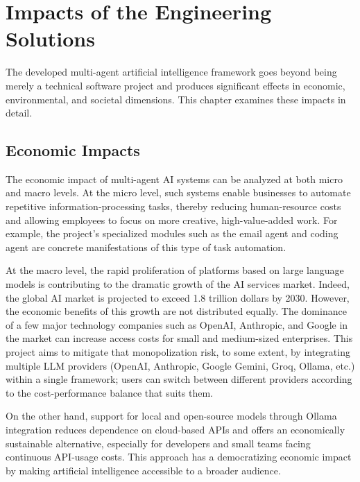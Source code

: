 \documentclass[11pt,a4paper]{report}
\begin{document}
\chapter{Impacts of the Engineering Solutions}

The developed multi-agent artificial intelligence framework goes beyond being
merely a technical software project and produces significant effects in
economic, environmental, and societal dimensions. This chapter examines these
impacts in detail.

\section{Economic Impacts}

The economic impact of multi-agent AI systems can be analyzed at both micro
and macro levels. At the micro level, such systems enable businesses to
automate repetitive information-processing tasks, thereby reducing
human-resource costs and allowing employees to focus on more creative,
high-value-added work. For example, the project's specialized modules such as
the email agent and coding agent are concrete manifestations of this type of
task automation.

At the macro level, the rapid proliferation of platforms based on large
language models is contributing to the dramatic growth of the AI services
market. Indeed, the global AI market is projected to exceed 1.8 trillion
dollars by 2030. However, the economic benefits of this growth are not
distributed equally. The dominance of a few major technology companies such
as OpenAI, Anthropic, and Google in the market can increase access costs for
small and medium-sized enterprises. This project aims to mitigate that
monopolization risk, to some extent, by integrating multiple LLM providers
(OpenAI, Anthropic, Google Gemini, Groq, Ollama, etc.) within a single
framework; users can switch between different providers according to the
cost-performance balance that suits them.

On the other hand, support for local and open-source models through Ollama
integration reduces dependence on cloud-based APIs and offers an economically
sustainable alternative, especially for developers and small teams facing
continuous API-usage costs. This approach has a democratizing economic impact
by making artificial intelligence accessible to a broader audience.
\end{document}
